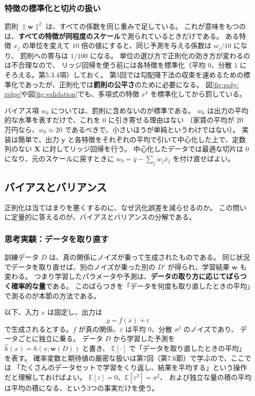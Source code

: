 \subsubsection{特徴の標準化と切片の扱い}

罰則 $\|\bm{w}\|^2$ は、すべての係数を同じ重みで足している。
これが意味をもつのは、\textbf{すべての特徴が同程度のスケール}で測られているときだけである。
ある特徴 $x_j$ の単位を変えて $10$ 倍の値にすると、同じ予測を与える係数は $w_j/10$ になり、
罰則への寄与は $1/100$ になる。
単位の選び方で正則化の効き方が変わるのは不合理なので、
リッジ回帰を使う前には各特徴を標準化（平均 $0$、分散 $1$ にそろえる。第5.3.4項）しておく。
第5回では勾配降下法の収束を速めるための標準化であったが、正則化では\textbf{罰則の公平さ}のために必要になる。
図\ref{fig:poly-ridge}や図\ref{fig:validation}でも、多項式の特徴 $x^k$ を標準化してから罰している。

バイアス項 $w_0$ については、罰則に含めないのが標準である。
$w_0$ は出力の平均的な水準を表すだけで、これを $0$ に引き寄せる理由はない
（家賃の平均が $20$ 万円なら、$w_0 \approx 20$ であるべきで、小さいほうが単純というわけではない）。
実装は簡単で、出力 $\bm{y}$ と各特徴をそれぞれの平均で引いて中心化した上で、定数列のない $\bm{X}$ に対してリッジ回帰を行う。
中心化したデータでは最適な切片は $0$ になり、元のスケールに戻すときに $w_0 = \bar{y} - \sum_j w_j\bar{x}_j$ を付け直せばよい。


\subsection{バイアスとバリアンス}

正則化は当てはまりを悪くするのに、なぜ汎化誤差を減らせるのか。
この問いに定量的に答えるのが、バイアスとバリアンスの分解である。

\subsubsection{思考実験：データを取り直す}

訓練データ $D$ は、真の関係にノイズが乗って生成されたものである。
同じ状況でデータを取り直せば、別のノイズが乗った別の $D'$ が得られ、学習結果 $\bm{w}$ も変わる。
つまり学習したパラメータや予測は、\textbf{データの取り方に応じてばらつく確率的な量}である。
このばらつきを「データを何度も取り直したときの平均」で測るのが本節の方法である。

以下、入力 $x$ は固定し、出力は
\begin{equation}
  y = f(x) + \varepsilon
  \label{eq:bv-model}
\end{equation}
で生成されるとする。$f$ が真の関係、$\varepsilon$ は平均 $0$、分散 $\sigma^2$ のノイズであり、
データごとに独立に乗る。
データ $D$ から学習した予測を $\hat{h}(x) = h(x; \bm{w}(D))$ と書き、
$\mathbb{E}[\cdot]$ で「データを取り直したときの平均」を表す。
確率変数と期待値の厳密な扱いは第7回（第7.6節）で学ぶので、ここでは
「たくさんのデータセットで学習をくり返し、結果を平均する」という操作だと理解しておけばよい。
$\mathbb{E}[\varepsilon] = 0$、$\mathbb{E}[\varepsilon^2] = \sigma^2$、
および独立な量の積の平均は平均の積になる、という3つの事実だけを使う。


